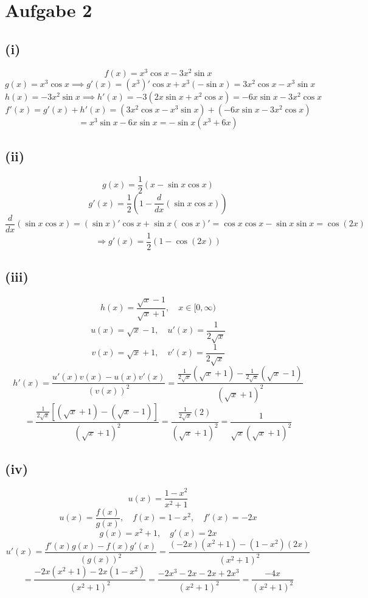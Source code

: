 \documentclass{article}
\begin{document}
\section*{Aufgabe 2}
\subsection*{(i)}
\[f(x) = x^3 \cos x - 3x^2 \sin x\]
\[g(x) = x^3 \cos x \implies g'(x) = (x^3)' \cos x + x^3(-\sin x) = 3x^2 \cos x - x^3 \sin x\]
\[h(x) = -3x^2 \sin x \implies h'(x) = -3(2x \sin x + x^2 \cos x) = -6x \sin x - 3x^2 \cos x\]
\[f'(x) = g'(x) + h'(x) = (3x^2 \cos x - x^3 \sin x) + (-6x \sin x - 3x^2 \cos x)\]
\[= x^3 \sin x - 6x \sin x = -\sin x (x^3 + 6x)\]


\subsection*{(ii)}
\[g(x) = \frac{1}{2}(x - \sin x \cos x)\]
\[g'(x) = \frac{1}{2} \left(1 - \frac{d}{dx}(\sin x \cos x) \right)\]
\[\frac{d}{dx}(\sin x \cos x) = (\sin x)' \cos x + \sin x (\cos x)' = \cos x \cos x - \sin x \sin x = \cos(2x)\]
\[\Rightarrow g'(x) = \frac{1}{2}(1 - \cos(2x))\]

\subsection*{(iii)}
\[h(x) = \frac{\sqrt{x} - 1}{\sqrt{x} + 1}, \quad x \in [0,\infty)\]
\[u(x) = \sqrt{x} - 1, \quad u'(x) = \frac{1}{2\sqrt{x}} \]
\[v(x) = \sqrt{x} + 1, \quad v'(x) = \frac{1}{2\sqrt{x}} \]
\[
h'(x) = \frac{u'(x) v(x) - u(x) v'(x)}{(v(x))^2}
= \frac{\frac{1}{2\sqrt{x}}(\sqrt{x} + 1) - \frac{1}{2\sqrt{x}}(\sqrt{x} - 1)}{(\sqrt{x} + 1)^2}
\]
\[
= \frac{\frac{1}{2\sqrt{x}} \left[(\sqrt{x} + 1) - (\sqrt{x} - 1)\right]}{(\sqrt{x} + 1)^2}
= \frac{\frac{1}{2\sqrt{x}}(2)}{(\sqrt{x} + 1)^2}
= \frac{1}{\sqrt{x}(\sqrt{x} + 1)^2}
\]

\subsection*{(iv)}
\[u(x) = \frac{1 - x^2}{x^2 + 1}\]
\[u(x) = \frac{f(x)}{g(x)}, \quad f(x) = 1 - x^2, \quad f'(x) = -2x\]
\[g(x) = x^2 + 1, \quad g'(x) = 2x\]
\[
u'(x) = \frac{f'(x)g(x) - f(x)g'(x)}{(g(x))^2}
= \frac{(-2x)(x^2 + 1) - (1 - x^2)(2x)}{(x^2 + 1)^2}
\]
\[
= \frac{-2x(x^2 + 1) - 2x(1 - x^2)}{(x^2 + 1)^2}
= \frac{-2x^3 - 2x - 2x + 2x^3}{(x^2 + 1)^2}
= \frac{-4x}{(x^2 + 1)^2}
\]
\end{document}
